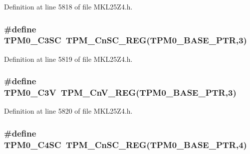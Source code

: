 Definition at line 5818 of file M\+K\+L25\+Z4.\+h.

\subsubsection[{\texorpdfstring{T\+P\+M0\+\_\+\+C3\+SC}{TPM0_C3SC}}]{\setlength{\rightskip}{0pt plus 5cm}\#define T\+P\+M0\+\_\+\+C3\+SC~{\bf T\+P\+M\+\_\+\+Cn\+S\+C\+\_\+\+R\+EG}({\bf T\+P\+M0\+\_\+\+B\+A\+S\+E\+\_\+\+P\+TR},3)}\hypertarget{group___t_p_m___register___accessor___macros_ga823b5976d091d234f6ac0cf84eb33f57}{}\label{group___t_p_m___register___accessor___macros_ga823b5976d091d234f6ac0cf84eb33f57}


Definition at line 5819 of file M\+K\+L25\+Z4.\+h.

\subsubsection[{\texorpdfstring{T\+P\+M0\+\_\+\+C3V}{TPM0_C3V}}]{\setlength{\rightskip}{0pt plus 5cm}\#define T\+P\+M0\+\_\+\+C3V~{\bf T\+P\+M\+\_\+\+Cn\+V\+\_\+\+R\+EG}({\bf T\+P\+M0\+\_\+\+B\+A\+S\+E\+\_\+\+P\+TR},3)}\hypertarget{group___t_p_m___register___accessor___macros_ga629753cc859bc8ddd614a14fc5ef8102}{}\label{group___t_p_m___register___accessor___macros_ga629753cc859bc8ddd614a14fc5ef8102}


Definition at line 5820 of file M\+K\+L25\+Z4.\+h.

\subsubsection[{\texorpdfstring{T\+P\+M0\+\_\+\+C4\+SC}{TPM0_C4SC}}]{\setlength{\rightskip}{0pt plus 5cm}\#define T\+P\+M0\+\_\+\+C4\+SC~{\bf T\+P\+M\+\_\+\+Cn\+S\+C\+\_\+\+R\+EG}({\bf T\+P\+M0\+\_\+\+B\+A\+S\+E\+\_\+\+P\+TR},4)}\hypertarget{group___t_p_m___register___accessor___macros_ga173abfcba6368ff6e5361fa8d4974276}{}\label{group___t_p_m___register___accessor___macros_ga173abfcba6368ff6e5361fa8d4974276}


